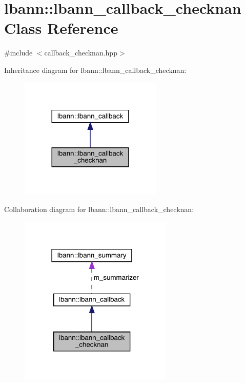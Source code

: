 \hypertarget{classlbann_1_1lbann__callback__checknan}{}\section{lbann\+:\+:lbann\+\_\+callback\+\_\+checknan Class Reference}
\label{classlbann_1_1lbann__callback__checknan}


{\ttfamily \#include $<$callback\+\_\+checknan.\+hpp$>$}



Inheritance diagram for lbann\+:\+:lbann\+\_\+callback\+\_\+checknan\+:\nopagebreak
\begin{figure}[H]
\begin{center}
\leavevmode
\includegraphics[width=192pt]{classlbann_1_1lbann__callback__checknan__inherit__graph}
\end{center}
\end{figure}


Collaboration diagram for lbann\+:\+:lbann\+\_\+callback\+\_\+checknan\+:\nopagebreak
\begin{figure}[H]
\begin{center}
\leavevmode
\includegraphics[width=207pt]{classlbann_1_1lbann__callback__checknan__coll__graph}
\end{center}
\end{figure}
